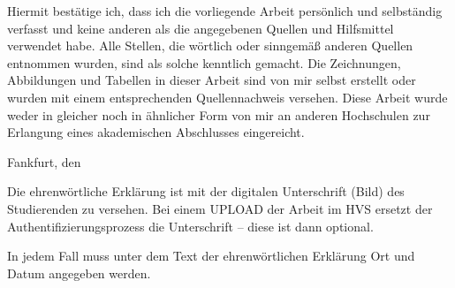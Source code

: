 %
%


Hiermit bestätige ich, dass ich die vorliegende Arbeit persönlich und selbständig verfasst und keine anderen als die angegebenen Quellen und Hilfsmittel verwendet habe. Alle Stellen, die wörtlich oder sinngemäß anderen Quellen entnommen wurden, sind als solche kenntlich gemacht. Die Zeichnungen, Abbildungen und Tabellen in dieser Arbeit sind von mir selbst erstellt oder wurden mit einem entsprechenden Quellennachweis versehen. Diese Arbeit wurde weder in gleicher noch in ähnlicher Form von mir an anderen Hochschulen zur Erlangung eines akademischen Abschlusses eingereicht.

\vspace{2cm}
Fankfurt, den \dotfill

\hspace{10cm} {\footnotesize \fullname}

\vspace{2cm}

Die ehrenwörtliche Erklärung ist mit der digitalen Unterschrift (Bild) des Studierenden zu versehen. Bei einem UPLOAD der Arbeit im HVS ersetzt der Authentifizierungsprozess die Unterschrift – diese ist dann optional. 

In jedem Fall muss unter dem Text der ehrenwörtlichen Erklärung Ort und Datum angegeben werden.